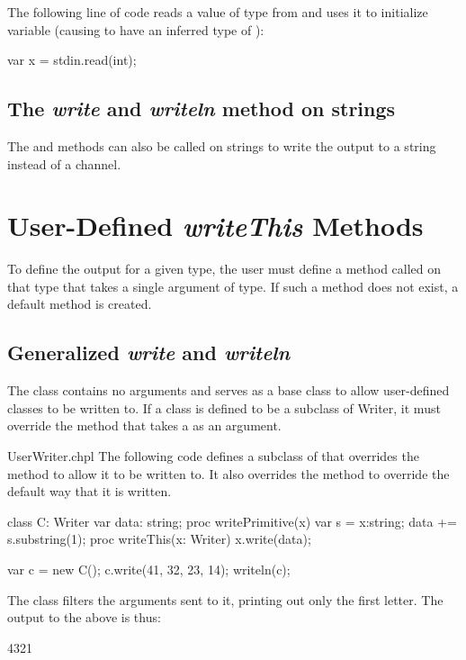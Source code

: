 \begin{example}
The following line of code reads a value of type  from
 and uses it to initialize variable  (causing
 to have an inferred type of ):
\begin{chapel}
var x = stdin.read(int);
\end{chapel}
\end{example}

\subsection{The {\em write} and {\em writeln} method on strings}
\label{stringwrite}

The  and  methods can also be called on
strings to write the output to a string instead of a channel.

\section{User-Defined {\em writeThis} Methods}

To define the output for a given type, the user must define a method
called  on that type that takes a single argument of
 type.  If such a method does not exist, a default method is
created.


\subsection{Generalized {\em write} and {\em writeln}}
\label{writer}

The  class contains no arguments and serves as a base
class to allow user-defined classes to be written to.  If a class is
defined to be a subclass of Writer, it must override
the  method that takes a  as an argument.

\begin{chapelexample}{UserWriter.chpl}
The following code defines a subclass of  that overrides
the  method to allow it to be written to.  It also
overrides the  method to override the default way that
it is written.
\begin{chapel}
class C: Writer {
  var data: string;
  proc writePrimitive(x) {
    var s = x:string;
    data += s.substring(1);
  }
  proc writeThis(x: Writer) {
    x.write(data);
  }
}

var c = new C();
c.write(41, 32, 23, 14);
writeln(c);
\end{chapel}
The  class filters the arguments sent to it, printing out only
the first letter.  The output to the above is thus:
\begin{chapelprintoutput}
4321
\end{chapelprintoutput}
\end{chapelexample}



